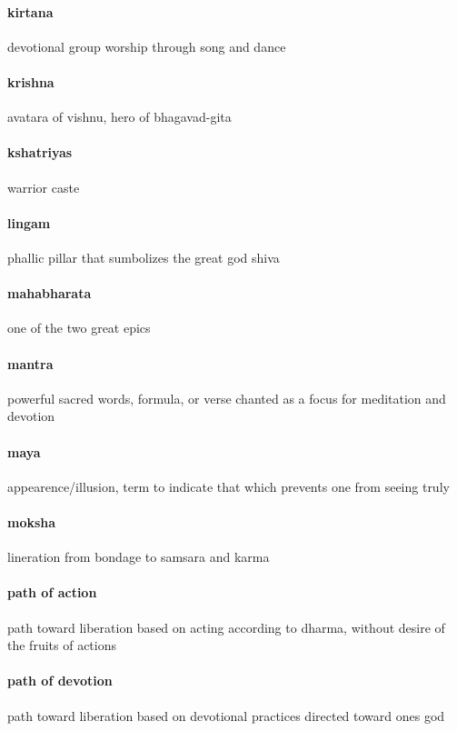\documentclass{article}
\begin{document}
\paragraph{kirtana}
\label{par:kirtana}
devotional group worship through song and dance
\paragraph{krishna}
\label{par:krishna}
avatara of vishnu, hero of bhagavad-gita
\paragraph{kshatriyas}
\label{par:kshatriyas}
warrior caste
\paragraph{lingam}
\label{par:lingam}
phallic pillar that sumbolizes the great god shiva
\paragraph{mahabharata}
\label{par:mahabharata}
one of the two great epics
\paragraph{mantra}
\label{par:mantra}
powerful sacred words, formula, or verse chanted as a focus for meditation and devotion
\paragraph{maya}
\label{par:maya}
appearence/illusion, term to indicate that which prevents one from seeing truly
\paragraph{moksha}
\label{par:moksha}
lineration from bondage to samsara and karma
\paragraph{path of action}
\label{par:path_of_action}
path toward liberation based on acting according to dharma, without desire of the fruits of actions
\paragraph{path of devotion}
\label{par:path_of_devotion}
path toward liberation based on devotional practices directed toward ones god
\end{document}
